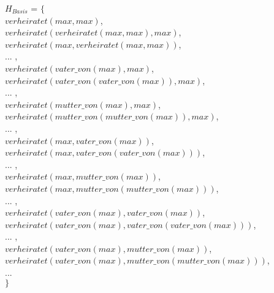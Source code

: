 \documentclass{article}
\begin{document}
$H_{Basis}$ = $\{$\\
$verheiratet(max,max)$,\\
$verheiratet(verheiratet(max,max),max)$,\\ $verheiratet(max,verheiratet(max,max))$,\\
... ,\\
$verheiratet(vater\_von(max),max)$,\\
$verheiratet(vater\_von(vater\_von(max)),max)$,\\
... ,\\
$verheiratet(mutter\_von(max),max)$,\\
$verheiratet(mutter\_von(mutter\_von(max)),max)$,\\
... ,\\
$verheiratet(max,vater\_von(max))$,\\
$verheiratet(max,vater\_von(vater\_von(max)))$,\\
... ,\\
$verheiratet(max,mutter\_von(max))$,\\
$verheiratet(max,mutter\_von(mutter\_von(max)))$,\\
... ,\\
$verheiratet(vater\_von(max),vater\_von(max))$,\\
$verheiratet(vater\_von(max),vater\_von(vater\_von(max)))$,\\
... ,\\
$verheiratet(vater\_von(max),mutter\_von(max))$,\\
$verheiratet(vater\_von(max),mutter\_von(mutter\_von(max)))$,\\
...\\
$\}$
\end{document}
